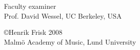 \documentclass[a4paper]{book}
\numberwithin{equation}{section}
\begin{document}
\vspace{1cm}

\begin{minipage}[l]{\linewidth}
Faculty examiner
\\[.3cm]
Prof. David Wessel, UC Berkeley, USA
\end{minipage}

\vspace{3cm}

\begin{minipage}[l]{\linewidth}
\copyright Henrik Frisk 2008\\
Malm\"{o} Academy of Music, Lund University
\end{minipage}
\end{document}
